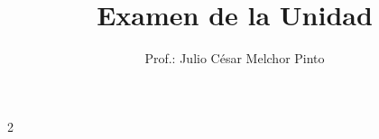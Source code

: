 \documentclass[12pt,addpoints]{evalua}
\title{Examen de la Unidad}
\author{Prof.: Julio César Melchor Pinto}
\begin{document}
\begin{questions}
    \question[10]{}
    \newpage
    \question[10]{}
    \question[5] {}
    \newpage
    \question[10]{ }

    \question[10]{ }
    \question[10]{ }
    \question[10]{ }

    \question[10]{ }
    \newpage
    \question[5] {}

    \setlength{\columnsep}{1cm}
    \begin{multicols}{2}
        \question[5] {}

        \columnbreak

        \question[5] {}
    \end{multicols}

    \newpage
    \question[10]{ }
\end{questions}
\begin{landscape}
    \begin{minipage}[b]{\textwidth}
        \thispagestyle{foot}
        \begin{table}[H]
            \centering
            \caption{Tabla Peri\'odica de los Elementos.}
            \TablaPeriodica[0.48]
            \label{tab:periodic_table}
        \end{table}
    \end{minipage}
\end{landscape}
\end{document}
